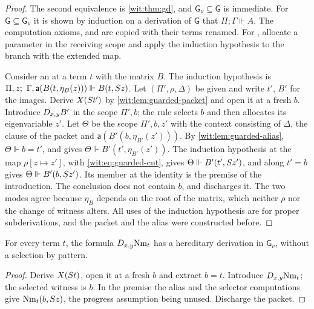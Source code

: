 \begin{proof}
The second equivalence is \cref{wit:thm:gd}, and
$\mathsf{G}_{\nu}\subseteq\mathsf{G}$ is immediate.  For
$\mathsf{G}\subseteq\mathsf{G}_{\nu}$ it is shown by induction on a
derivation of $\mathsf{G}$ that $\Pi;\Gamma\Vdash A$.  The computation
axioms,  and  are copied with their terms
renamed.  For , allocate a parameter in the receiving scope
and apply the induction hypothesis to the branch with the extended map.

Consider an  at a term $t$ with the matrix $B$.  The
induction hypothesis is
$\Pi,z;\ \Gamma,\mathsf{a}(B(t,\eta_B(z)))\Vdash B(t,\Suc z)$.  Let
$(\Pi',\rho,\Delta)$ be given and write $t'$, $B'$ for the images.  Derive
$X(S t')$ by \cref{wit:lem:guarded-packet} and open it at a fresh $b$.
Introduce $D_{x,y}B'$ in the scope $\Pi',b$; the rule selects $b$ and then
allocates its eigenvariable $z'$.  Let $\Theta$ be the scope $\Pi',b,z'$
with the context consisting of $\Delta$, the clause of the packet and
$\mathsf{a}(B'(b,\eta_{B'}(z')))$.  By \cref{wit:lem:guarded-alias},
$\Theta\Vdash b=t'$, and  gives
$\Theta\Vdash B'(t',\eta_{B'}(z'))$.  The induction hypothesis at the map
$\rho[z\mapsto z']$, with \eqref{wit:eq:guarded-cut}, gives
$\Theta\Vdash B'(t',S z')$, and  along $t'=b$ gives
$\Theta\Vdash B'(b,S z')$.  Its member at the identity is the premise of
the introduction.  The conclusion does not contain $b$, and 
discharges it.  The two modes agree because $\eta_B$ depends on the root of
the matrix, which neither $\rho$ nor the change of witness alters.  All uses
of the induction hypothesis are for proper subderivations, and the packet
and the alias were constructed before.
\end{proof}

\begin{corollary}
\label{wit:cor:guarded-name}
For every term $t$, the formula $D_{x,y}\mathrm{Nm}_t$ has a hereditary
derivation in $\mathsf{G}_{\nu}$, without a selection by pattern.
\end{corollary}

\begin{proof}
Derive $X(S t)$, open it at a fresh $b$ and extract $b=t$.  Introduce
$D_{x,y}\mathrm{Nm}_t$; the selected witness is $b$.  In the premise the
alias and the selector computations give $\mathrm{Nm}_t(b,S z)$, the
progress assumption being unused.  Discharge the packet.
\end{proof}

